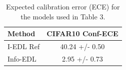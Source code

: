\begin{table}[t]
\centering
\caption{Expected calibration error (ECE) for the models used in Table 3.}
\small
\begin{tabular}{lc}
\toprule
Method & CIFAR10 Conf-ECE \\
\midrule
I-EDL Ref & 40.24 +/- 0.50 \\
Info-EDL & 2.95 +/- 0.73 \\
\bottomrule
\end{tabular}
\end{table}
